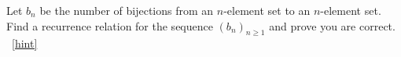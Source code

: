 \documentclass{book}
\begin{document}
\setcounter{project}{136}
\addtocounter{project}{-1}
\begin{activity}[]\label{activity-129}
\hypertarget{p-948}{}%
Let \(b_n\) be the number of bijections from an \(n\)-element set to an \(n\)-element set.  Find a recurrence relation for the sequence \((b_n)_{n \ge 1}\) and prove you are correct.%
~\hfill{\tiny\hyperlink{a-136}{[hint]}\hypertarget{q-136}{}}\end{activity}
\end{document}

